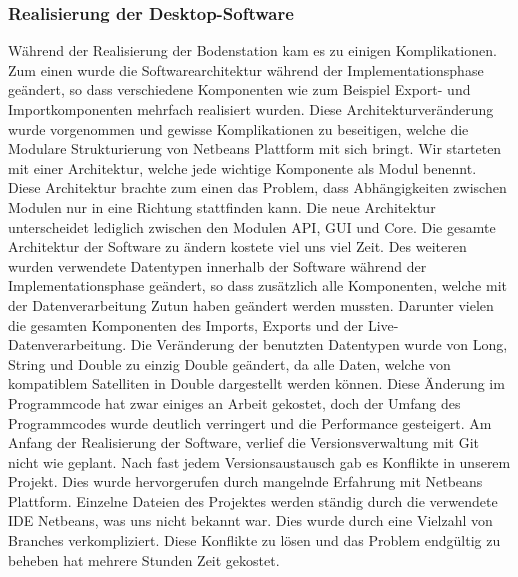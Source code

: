 \subsubsection{Realisierung der Desktop-Software}
Während der Realisierung der Bodenstation kam es zu einigen Komplikationen. Zum einen wurde die Softwarearchitektur während der Implementationsphase geändert, so dass verschiedene Komponenten wie zum Beispiel Export- und Importkomponenten mehrfach realisiert wurden. Diese Architekturveränderung wurde vorgenommen und gewisse Komplikationen zu beseitigen, welche die Modulare Strukturierung von Netbeans Plattform mit sich bringt. Wir starteten mit einer Architektur, welche jede wichtige Komponente als Modul benennt. Diese Architektur brachte zum einen das Problem, dass Abhängigkeiten zwischen Modulen nur in eine Richtung stattfinden kann. Die neue Architektur unterscheidet lediglich zwischen den Modulen API, GUI und Core. Die gesamte Architektur der Software zu ändern kostete viel uns viel Zeit.
Des weiteren wurden verwendete Datentypen innerhalb der Software während der Implementationsphase geändert, so dass zusätzlich alle Komponenten, welche mit der Datenverarbeitung Zutun haben geändert werden mussten. Darunter vielen die gesamten Komponenten des Imports, Exports und der Live-Datenverarbeitung. Die Veränderung der benutzten Datentypen wurde von Long, String und Double zu einzig Double geändert, da alle Daten, welche von kompatiblem Satelliten in Double dargestellt werden können. Diese Änderung im Programmcode hat zwar einiges an Arbeit gekostet, doch der Umfang des Programmcodes wurde deutlich verringert und die Performance gesteigert.
Am Anfang der Realisierung der Software, verlief die Versionsverwaltung mit Git nicht wie geplant. Nach fast jedem Versionsaustausch gab es Konflikte in unserem Projekt. Dies wurde hervorgerufen durch mangelnde Erfahrung mit Netbeans Plattform. Einzelne Dateien des Projektes werden ständig durch die verwendete IDE Netbeans, was uns nicht bekannt war. Dies wurde durch eine Vielzahl von Branches verkompliziert. Diese Konflikte zu lösen und das Problem endgültig zu beheben hat mehrere Stunden Zeit gekostet.
